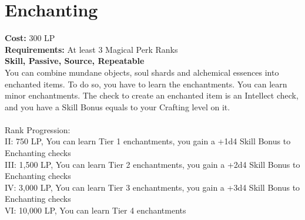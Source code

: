 \section{Enchanting}\label{perk:enchanting}
\textbf{Cost:} 300 LP\\
\textbf{Requirements:} At least 3 Magical Perk Ranks\\
\textbf{Skill, Passive, Source, Repeatable}\\
You can combine mundane objects, soul shards and alchemical essences into enchanted items.
To do so, you have to learn the enchantments.
You can learn minor enchantments.
The check to create an enchanted item is an Intellect check, and you have a Skill Bonus equals to your Crafting level on it.\\
\\
Rank Progression:\\
II: 750 LP, You can learn Tier 1 enchantments, you gain a +1d4 Skill Bonus to Enchanting checks\\
III: 1,500 LP, You can learn Tier 2 enchantments, you gain a +2d4 Skill Bonus to Enchanting checks\\
IV: 3,000 LP, You can learn Tier 3 enchantments, you gain a +3d4 Skill Bonus to Enchanting checks\\
VI: 10,000 LP, You can learn Tier 4 enchantments\\